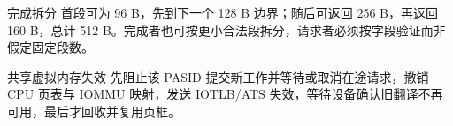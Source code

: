 \begin{chapteranswer}{完成拆分}
首段可为 96 B，先到下一个 128 B 边界；随后可返回 256 B，再返回 160 B，总计 512 B。完成者也可按更小合法段拆分，请求者必须按字段验证而非假定固定段数。
\end{chapteranswer}

\begin{chapteranswer}{共享虚拟内存失效}
先阻止该 PASID 提交新工作并等待或取消在途请求，撤销 CPU 页表与 IOMMU 映射，发送 IOTLB/ATS 失效，等待设备确认旧翻译不再可用，最后才回收并复用页框。
\end{chapteranswer}
